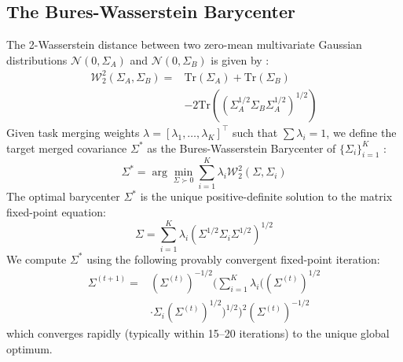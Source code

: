 \documentclass{article}
\theoremstyle{plain}
\theoremstyle{definition}
\theoremstyle{remark}
\begin{document}
\subsection{The Bures-Wasserstein Barycenter}
\label{submission-method-barycenter}
The 2-Wasserstein distance between two zero-mean multivariate Gaussian distributions $\mathcal{N}(0, \Sigma_A)$ and $\mathcal{N}(0, \Sigma_B)$ is given by \cite{gelbrich90, dowson82}:
\begin{equation}
  \begin{split}
    \mathcal{W}_2^2(\Sigma_A, \Sigma_B) = {} & \text{Tr}(\Sigma_A) + \text{Tr}(\Sigma_B) \\
    & - 2 \text{Tr} \left( (\Sigma_A^{1/2} \Sigma_B \Sigma_A^{1/2})^{1/2} \right)
  \end{split}
\end{equation}
Given task merging weights $\lambda = [\lambda_1, \dots, \lambda_K]^\top$ such that $\sum \lambda_i = 1$, we define the target merged covariance $\Sigma^*$ as the Bures-Wasserstein Barycenter of $\{\Sigma_i\}_{i=1}^K$ \cite{agueh11}:
\begin{equation}
  \Sigma^* = \arg\min_{\Sigma \succ 0} \sum_{i=1}^K \lambda_i \mathcal{W}_2^2(\Sigma, \Sigma_i)
\end{equation}
The optimal barycenter $\Sigma^*$ is the unique positive-definite solution to the matrix fixed-point equation:
\begin{equation}
  \label{eq:fixed_point}
  \Sigma = \sum_{i=1}^K \lambda_i (\Sigma^{1/2} \Sigma_i \Sigma^{1/2})^{1/2}
\end{equation}
We compute $\Sigma^*$ using the following provably convergent fixed-point iteration:
\begin{equation}
  \begin{split}
    \Sigma^{(t+1)} = {} & (\Sigma^{(t)})^{-1/2} \Bigg( \sum_{i=1}^K \lambda_i \Big( (\Sigma^{(t)})^{1/2} \\
    & \cdot \Sigma_i (\Sigma^{(t)})^{1/2} \Big)^{1/2} \Bigg)^2 (\Sigma^{(t)})^{-1/2}
  \end{split}
\end{equation}
which converges rapidly (typically within 15--20 iterations) to the unique global optimum.
\end{document}
